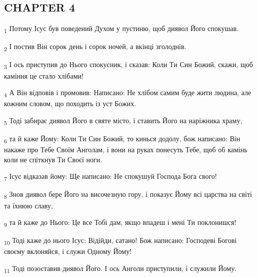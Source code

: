 \subsection{CHAPTER 4}
\begin{tcolorbox}
\textsubscript{1} Потому Ісус був поведений Духом у пустиню, щоб диявол Його спокушав.
\end{tcolorbox}
\begin{tcolorbox}
\textsubscript{2} І постив Він сорок день і сорок ночей, а вкінці зголоднів.
\end{tcolorbox}
\begin{tcolorbox}
\textsubscript{3} І ось приступив до Нього спокусник, і сказав: Коли Ти Син Божий, скажи, щоб каміння це стало хлібами!
\end{tcolorbox}
\begin{tcolorbox}
\textsubscript{4} А Він відповів і промовив: Написано: Не хлібом самим буде жити людина, але кожним словом, що походить із уст Божих.
\end{tcolorbox}
\begin{tcolorbox}
\textsubscript{5} Тоді забирає диявол Його в святе місто, і ставить Його на наріжника храму,
\end{tcolorbox}
\begin{tcolorbox}
\textsubscript{6} та й каже Йому: Коли Ти Син Божий, то кинься додолу, бож написано: Він накаже про Тебе Своїм Анголам, і вони на руках понесуть Тебе, щоб об камінь коли не спіткнув Ти Своєї ноги.
\end{tcolorbox}
\begin{tcolorbox}
\textsubscript{7} Ісус відказав йому: Ще написано: Не спокушуй Господа Бога свого!
\end{tcolorbox}
\begin{tcolorbox}
\textsubscript{8} Знов диявол бере Його на височезную гору, і показує Йому всі царства на світі та їхнюю славу,
\end{tcolorbox}
\begin{tcolorbox}
\textsubscript{9} та й каже до Нього: Це все Тобі дам, якщо впадеш і мені Ти поклонишся!
\end{tcolorbox}
\begin{tcolorbox}
\textsubscript{10} Тоді каже до нього Ісус: Відійди, сатано! Бож написано: Господеві Богові своєму вклоняйся, і служи Одному Йому!
\end{tcolorbox}
\begin{tcolorbox}
\textsubscript{11} Тоді позоставив диявол Його. І ось Анголи приступили, і служили Йому.
\end{tcolorbox}
